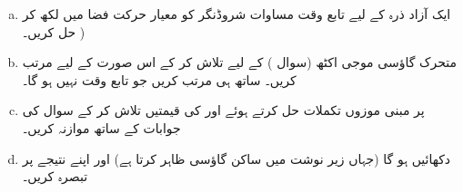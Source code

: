 \begin{enumerate}[a.]
\item 
 ایک آزاد ذرہ کے لیے تابع وقت مساوات شروڈنگر کو معیار حرکت فضا میں لکھ کر حل کریں۔  ) 
\item
 متحرک گاؤسی موجی اکٹھ (سوال ) کے لیے  تلاش کر کے اس صورت کے لیے  مرتب کریں۔ ساتھ ہی  مرتب کریں جو تابع وقت نہیں ہو گا۔ 
 \item
  پر مبنی موزوں تکملات حل کرتے ہوئے  اور  کی قیمتیں تلاش کر کے سوال  کی جوابات کے ساتھ موازنہ کریں۔ 
 \item
 دکھائیں  ہو گا (جہاں زیر نوشت میں ساکن گاؤسی ظاہر کرتا ہے) اور اپنے نتیجے پر تبصرہ کریں۔
 \end{enumerate}



